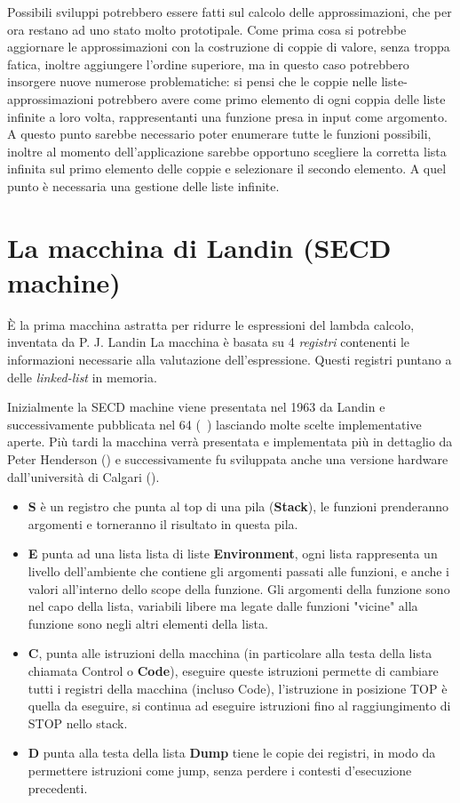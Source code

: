\documentclass{article}
\begin{document}
Possibili sviluppi potrebbero essere fatti sul calcolo delle approssimazioni, che per ora restano ad uno stato molto prototipale. Come prima cosa si potrebbe aggiornare le approssimazioni con la costruzione di coppie di valore, senza troppa fatica, inoltre aggiungere l'ordine superiore, ma in questo caso potrebbero insorgere nuove numerose problematiche: si pensi che le coppie nelle liste-approssimazioni potrebbero avere come primo elemento di ogni coppia delle liste infinite a loro volta, rappresentanti una funzione presa in input come argomento. A questo punto sarebbe necessario poter enumerare tutte le funzioni possibili, inoltre al momento dell'applicazione sarebbe opportuno scegliere la corretta lista infinita sul primo elemento delle coppie e selezionare il secondo elemento. A quel punto è necessaria una gestione delle liste infinite.


\appendix

\section{La macchina di Landin (SECD machine)}
\label{sec:landin}
È la prima macchina astratta per ridurre le espressioni del lambda calcolo, inventata da P. J. Landin La macchina è basata su 4 \emph{registri} contenenti le informazioni necessarie alla valutazione dell'espressione. Questi registri puntano a delle \emph{linked-list} in memoria.

Inizialmente la SECD machine viene presentata nel 1963 da Landin e successivamente pubblicata nel 64 (~\cite{LandinPJ}) lasciando molte scelte implementative aperte. Più tardi la macchina verrà presentata e implementata più in dettaglio da Peter Henderson (\cite{Henderson}) e successivamente fu sviluppata anche una versione hardware dall'università di Calgari (\cite{DesIsu}).

\begin{itemize}
	\item \textbf{S} è un registro che punta al top di una pila (\textbf{Stack}), le funzioni prenderanno argomenti e torneranno il risultato in questa pila.
	\item \textbf{E} punta ad una lista lista di liste \textbf{Environment}, ogni lista rappresenta un livello dell'ambiente che contiene gli argomenti passati alle funzioni, e anche i valori all'interno dello scope della funzione.
	Gli argomenti della funzione sono nel capo della lista, variabili libere ma legate dalle funzioni "vicine" alla funzione sono negli altri elementi della lista.
	\item \textbf{C}, punta alle istruzioni della macchina (in particolare alla testa della lista chiamata Control o \textbf{Code}), eseguire queste istruzioni permette di cambiare tutti i registri della macchina (incluso Code), l'istruzione in posizione TOP è quella da eseguire, si continua ad eseguire istruzioni fino al raggiungimento di STOP nello stack.
	\item \textbf{D} punta alla testa della lista \textbf{Dump} tiene le copie dei registri, in modo da permettere istruzioni come jump, senza perdere i contesti d'esecuzione precedenti.
\end{itemize}
\end{document}
